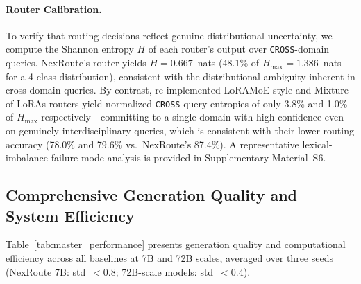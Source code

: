 \documentclass[a4paper,fleql]{cas-sc}
\begin{document}
\paragraph{Router Calibration.}
To verify that routing decisions reflect genuine distributional uncertainty,
we compute the Shannon entropy $H$ of each router's output over
\texttt{CROSS}-domain queries. NexRoute's router yields $H{=}0.667$~nats
(48.1\% of $H_{\max}{=}1.386$~nats for a 4-class distribution), consistent
with the distributional ambiguity inherent in cross-domain queries. By contrast, re-implemented LoRAMoE-style
and Mixture-of-LoRAs routers yield normalized \texttt{CROSS}-query entropies
of only 3.8\% and 1.0\% of $H_{\max}$ respectively---committing to a single
domain with high confidence even on genuinely interdisciplinary queries, which
is consistent with their lower routing accuracy (78.0\% and 79.6\% vs.\
NexRoute's 87.4\%). A representative lexical-imbalance failure-mode analysis
is provided in Supplementary Material~S6.

\subsection{Comprehensive Generation Quality and System Efficiency}
\label{ssec:comprehensive}
Table~\ref{tab:master_performance} presents generation quality and computational efficiency across all baselines at 7B and 72B scales, averaged over three seeds (NexRoute 7B: std\ $<0.8$; 72B-scale models: std\ $<0.4$).
\end{document}
